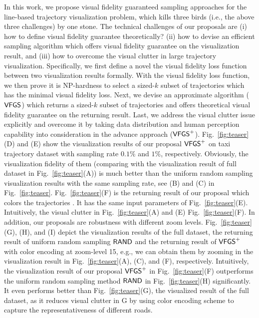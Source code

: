 In this work, we propose visual fidelity guaranteed sampling approaches for the line-based trajectory visualization problem,
which kills three birds (i.e., the above three challenges) by one stone.
The technical challenges of our proposals are
(i) how to define visual fidelity guarantee theoretically?
(ii) how to devise an efficient sampling algorithm which offers visual fidelity guarantee on the visualization result,
and (iii) how to overcome the visual clutter in large trajectory visualization.
Specifically, we first define a novel the visual fidelity loss function between two visualization results formally.
With the visual fidelity loss function, we then prove it is NP-hardness to select a sized-$k$ subset of trajectories which has the minimal visual fidelity loss.
Next, we devise an approximate algorithm ($\mathsf{VFGS}$) which returns a sized-$k$ subset of trajectories and offers theoretical visual fidelity guarantee on the returning result.
Last, we address the visual clutter issue explicitly and overcome it by taking data distribution and human perception capability into consideration in the advance approach ($\mathsf{VFGS}^{+}$).
Fig.~\ref{fig:teaser}(D) and (E) show the visualization results of our proposal $\mathsf{VFGS}^{+}{}$ on \pt{} taxi trajectory dataset with  sampling rate $0.1\%$ and $1\%$, respectively.
Obviously, the visualization fidelity of them (comparing with the visualization result of full dataset in Fig.~\ref{fig:teaser}(A)) is much better than
the uniform random sampling visualization results with the same sampling rate, see (B) and (C) in Fig.~\ref{fig:teaser}.
Fig.~\ref{fig:teaser}(F) is the returning result of our proposal which colors the trajectories .
It has the same input parameters of Fig.~\ref{fig:teaser}(E).
Intuitively, the visual clutter in Fig.~\ref{fig:teaser}(A) and (E)  Fig.~\ref{fig:teaser}(F).
In addition, our proposals are robustness with different zoom levels.
Fig.~\ref{fig:teaser}(G), (H), and (I) depict the visualization results of the full \pt{} dataset, the returning result of uniform random sampling $\mathsf{RAND}$ and the returning result of $\mathsf{VFGS}^{+}$ with color encoding at zoom-level 15, e.g., we can obtain them by zooming in the visualization result in Fig.~\ref{fig:teaser}(A), (C), and (F), respectively.
Intuitively, the visualization result of our proposal $\mathsf{VFGS}^{+}$ in Fig.~\ref{fig:teaser}(F) outperforms the uniform random sampling method $\mathsf{RAND}$ in Fig.~\ref{fig:teaser}(H) significantly.
It even performs better than Fig.~\ref{fig:teaser}(G), the visualized result of the full dataset, as it reduces visual clutter in G by using color encoding scheme to capture the representativeness of different roads.

